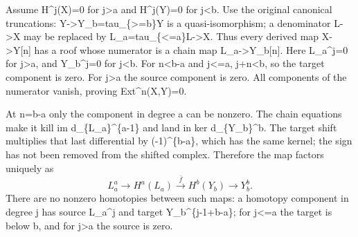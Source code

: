 \documentclass[11pt]{article}
\begin{document}
Assume H\textasciicircum{}j(X)\allowbreak{}\allowbreak{}=0 for j\textgreater a and H\textasciicircum{}j(Y)\allowbreak{}\allowbreak{}=0 for j\textless b. Use the original canonical truncations:\allowbreak{} Y\allowbreak{}->Y\_\allowbreak{}b\allowbreak{}=tau\_\allowbreak{}\{>\allowbreak{}=b\}Y is a quasi-isomorphism; a denominator L\allowbreak{}->X may be replaced by L\_\allowbreak{}a\allowbreak{}=tau\_\allowbreak{}\{<\allowbreak{}=a\}L\allowbreak{}->X. Thus every derived map X\allowbreak{}->Y[n]\allowbreak{} has a roof whose numerator is a chain map L\_\allowbreak{}a\allowbreak{}->Y\_\allowbreak{}b[n]\allowbreak{}. Here L\_\allowbreak{}a\textasciicircum{}j\allowbreak{}=0 for j>a,\allowbreak{} and Y\_\allowbreak{}b\textasciicircum{}j\allowbreak{}=0 for j\textless b. For n\textless b-a and j<\allowbreak{}=a,\allowbreak{} j\allowbreak{}+n<b,\allowbreak{} so the target component is zero. For j\textgreater a the source component is zero. All components of the numerator vanish,\allowbreak{} proving Ext\textasciicircum{}n(X,\allowbreak{}Y)\allowbreak{}\allowbreak{}=0.

At n\allowbreak{}=b-a only the component in degree a can be nonzero. The chain equations make it kill im d\_\allowbreak{}\{L\_\allowbreak{}a\}\textasciicircum{}\{a-1\} and land in ker d\_\allowbreak{}\{Y\_\allowbreak{}b\}\textasciicircum{}b. The target shift multiplies that last differential by (-1)\allowbreak{}\textasciicircum{}\{b-a\},\allowbreak{} which has the same kernel; the sign has not been removed from the shifted complex. Therefore the map factors uniquely as \[
 L_a^a\longrightarrow H^a(L_a)
 \xrightarrow{\bar f} H^b(Y_b)
 \longrightarrow Y_b^b.                                    \tag{8.1}
\] There are no nonzero homotopies between such maps:\allowbreak{} a homotopy component in degree j has source L\_\allowbreak{}a\textasciicircum{}j and target Y\_\allowbreak{}b\textasciicircum{}\{j-1\allowbreak{}+b-a\}; for j<\allowbreak{}=a the target is below b,\allowbreak{} and for j\textgreater a the source is zero.
\end{document}
